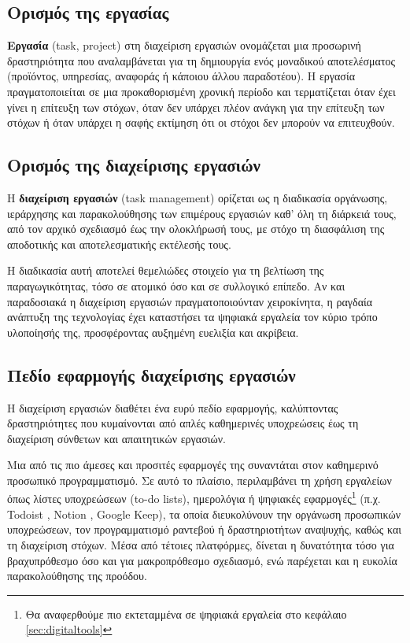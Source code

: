         \subsection{Ορισμός της εργασίας}
            \textbf{Εργασία} (task, project) στη διαχείριση εργασιών ονομάζεται μια προσωρινή δραστηριότητα που αναλαμβάνεται για τη δημιουργία ενός μοναδικού αποτελέσματος (προϊόντος, υπηρεσίας, αναφοράς ή κάποιου άλλου παραδοτέου). Η εργασία πραγματοποιείται σε μια προκαθορισμένη χρονική περίοδο και τερματίζεται όταν έχει γίνει η επίτευξη των στόχων, όταν δεν υπάρχει πλέον ανάγκη για την επίτευξη των στόχων ή όταν υπάρχει η σαφής εκτίμηση ότι οι στόχοι δεν μπορούν να επιτευχθούν. \cite{PMBOK}

        \subsection{Ορισμός της διαχείρισης εργασιών}
            Η \textbf{διαχείριση εργασιών} (task management) ορίζεται ως η διαδικασία οργάνωσης, ιεράρχησης και παρακολούθησης των επιμέρους εργασιών καθ’ όλη τη διάρκειά τους, από τον αρχικό σχεδιασμό έως την ολοκλήρωσή τους, με στόχο τη διασφάλιση της αποδοτικής και αποτελεσματικής εκτέλεσής τους.

            Η διαδικασία αυτή αποτελεί θεμελιώδες στοιχείο για τη βελτίωση της παραγωγικότητας, τόσο σε ατομικό όσο και σε συλλογικό επίπεδο. Αν και παραδοσιακά η διαχείριση εργασιών πραγματοποιούνταν χειροκίνητα, η ραγδαία ανάπτυξη της τεχνολογίας έχει καταστήσει τα ψηφιακά εργαλεία τον κύριο τρόπο υλοποίησής της, προσφέροντας αυξημένη ευελιξία και ακρίβεια.

        \subsection{Πεδίο εφαρμογής διαχείρισης εργασιών}
            Η διαχείριση εργασιών διαθέτει ένα ευρύ πεδίο εφαρμογής, καλύπτοντας δραστηριότητες που κυμαίνονται από απλές καθημερινές υποχρεώσεις έως τη διαχείριση σύνθετων και απαιτητικών εργασιών.

            Μια από τις πιο άμεσες και προσιτές εφαρμογές της συναντάται στον καθημερινό προσωπικό προγραμματισμό. Σε αυτό το πλαίσιο, περιλαμβάνει τη χρήση εργαλείων όπως λίστες υποχρεώσεων (to-do lists), ημερολόγια ή ψηφιακές εφαρμογές\footnote{Θα αναφερθούμε πιο εκτεταμμένα σε ψηφιακά εργαλεία στο κεφάλαιο \ref{sec:digitaltools}} (π.χ. Todoist \cite{Todoist}, Notion \cite{Notion}, Google Keep), τα οποία διευκολύνουν την οργάνωση προσωπικών υποχρεώσεων, τον προγραμματισμό ραντεβού ή δραστηριοτήτων αναψυχής, καθώς και τη διαχείριση στόχων. Μέσα από τέτοιες πλατφόρμες, δίνεται η δυνατότητα τόσο για βραχυπρόθεσμο όσο και για μακροπρόθεσμο σχεδιασμό, ενώ παρέχεται και η ευκολία παρακολούθησης της προόδου.

